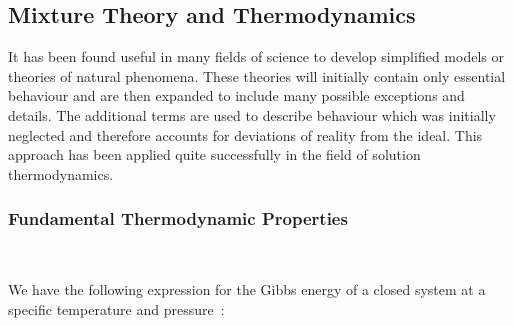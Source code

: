 
%

\subsection{Mixture Theory and Thermodynamics}

It has been found useful in many fields of science to develop simplified models or theories of natural phenomena. These theories will initially contain only essential behaviour and are then expanded to include many possible exceptions and details. The additional terms are used to describe behaviour which was initially neglected and therefore accounts for deviations of reality from the ideal. This approach has been applied quite successfully in the field of solution thermodynamics.\

\subsubsection{Fundamental Thermodynamic Properties}\

We have the following expression for the Gibbs energy of a closed system at a specific temperature and pressure~\cite{SmithNessAbbott}:\


